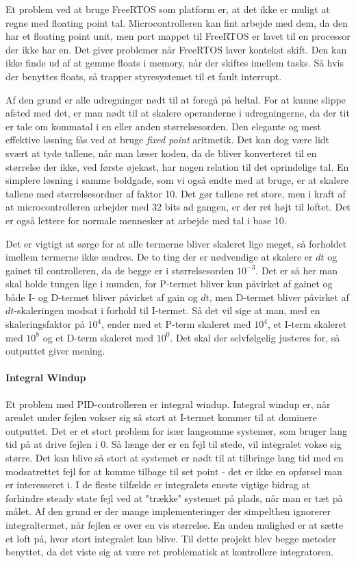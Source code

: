 Et problem ved at bruge FreeRTOS som platform er, at det ikke er muligt at regne med floating point tal. Microcontrolleren kan fint arbejde med dem, da den har et floating point unit, men port mappet til FreeRTOS er lavet til en processor der ikke har en. Det giver problemer når FreeRTOS laver kontekst skift. Den kan ikke finde ud af at gemme floats i memory, når der skiftes imellem tasks. Så hvis der benyttes floats, så trapper styresystemet til et fault interrupt.

Af den grund er alle udregninger nødt til at foregå på heltal. For at kunne slippe afsted med det, er man nødt til at skalere operanderne i udregningerne, da der tit er tale om kommatal i en eller anden størrelsesorden. Den elegante og mest effektive løsning fås ved at bruge \textit{fixed point} aritmetik. Det kan dog være lidt svært at tyde tallene, når man læser koden, da de bliver konverteret til en størrelse der ikke, ved første øjekast, har nogen relation til det oprindelige tal. En simplere løsning i samme boldgade, som vi også endte med at bruge, er at skalere tallene med størrelsesordner af faktor 10. Det gør tallene ret store, men i kraft af at microcontrolleren arbejder med 32 bits ad gangen, er der ret højt til loftet. Det er også lettere for normale mennesker at arbejde med tal i base 10.

Det er vigtigt at sørge for at alle termerne bliver skaleret lige meget, så forholdet imellem termerne ikke ændres. De to ting der er nødvendige at skalere er $dt$ og gainet til controlleren, da de begge er i størrelsesorden $10^{-3}$. Det er så her man skal holde tungen lige i munden, for P-termet bliver kun påvirket af gainet og både I- og D-termet bliver påvirket af gain og $dt$, men D-termet bliver påvirket af $dt$-skaleringen modsat i forhold til I-termet. Så det vil sige at man, med en skaleringsfaktor på $10^4$, ender med et P-term skaleret med $10^4$, et I-term skaleret med $10^8$ og et D-term skaleret med $10^0$. Det skal der selvfølgelig justeres for, så outputtet giver mening.

\paragraph{Integral Windup}

Et problem med PID-controlleren er integral windup. Integral windup er, når arealet under fejlen vokser sig så stort at I-termet kommer til at dominere outputtet. Det er et stort problem for især langsomme systemer, som bruger lang tid på at drive fejlen i 0. Så længe der er en fejl til stede, vil integralet vokse sig større. Det kan blive så stort at systemet er nødt til at tilbringe lang tid med en modsatrettet fejl for at komme tilbage til set point - det er ikke en opførsel man er interesseret i. I de fleste tilfælde er integralets eneste vigtige bidrag at forhindre steady state fejl ved at "trække" systemet på plads, når man er tæt på målet. Af den grund er der mange implementeringer der simpelthen ignorerer integraltermet, når fejlen er over en vis størrelse. En anden mulighed er at sætte et loft på, hvor stort integralet kan blive. Til dette projekt blev begge metoder benyttet, da det viste sig at være ret problematisk at kontrollere integratoren. 

